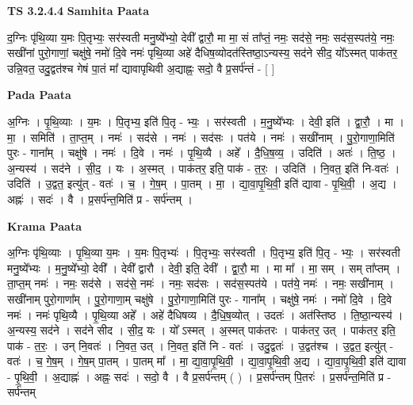 \documentclass[17pt]{extarticle}
\begin{document}
\textbf{TS 3.2.4.4 } \newline
\textbf{Samhita Paata} \newline

द॒ग्निः पृ॑थि॒व्या य॒मः पि॒तृभ्यः॒ सर॑स्वती मनु॒ष्ये᳚भ्यो॒ देवी᳚ द्वारौ॒ मा मा॒ सं ता᳚प्तं॒ नमः॒ सद॑से॒ नमः॒ सद॑स॒स्पत॑ये॒ नमः॒ सखी॑नां पुरो॒गाणां॒ चक्षु॑षे॒ नमो॑ दि॒वे नमः॑ पृथि॒व्या अहे॑ दैधिष॒व्योदत॑स्तिष्ठा॒ऽन्यस्य॒ सद॑ने सीद॒ यो᳚ऽस्मत् पाक॑तर॒ उन्नि॒वत॒ उदु॒द्वत॑श्च गेषं पा॒तं मा᳚ द्यावापृथिवी अ॒द्याह्नः॒ सदो॒ वै प्र॒सर्प॑न्तं - [  ] \newline

\textbf{Pada Paata} \newline

अ॒ग्निः । पृ॒थि॒व्याः । य॒मः । पि॒तृभ्य॒ इति॑ पि॒तृ - भ्यः॒ । सर॑स्वती । म॒नु॒ष्ये᳚भ्यः । देवी॒ इति॑ । द्वा॒रौ॒ । मा । मा॒ । समिति॑ । ता॒प्त॒म् । नमः॑ । सद॑से । नमः॑ । सद॑सः । पत॑ये । नमः॑ । सखी॑नाम् । पु॒रो॒गाणा॒मिति॑ पुरः - गाना᳚म् । चक्षु॑षे । नमः॑ । दि॒वे । नमः॑ । पृ॒थि॒व्यै । अहे᳚ । दै॒धि॒ष॒व्य॒ । उदिति॑ । अतः॑ । ति॒ष्ठ॒ । अ॒न्यस्य॑ । सद॑ने । सी॒द॒ । यः । अ॒स्मत् । पाक॑तर॒ इति॒ पाक॑ - त॒रः॒ । उदिति॑ । नि॒वत॒ इति॑ नि-वतः॑ । उदिति॑ । उ॒द्वत॒ इत्यु॑त् - वतः॑ । च॒ । गे॒ष॒म् । पा॒तम् । मा॒ । द्या॒वा॒पृ॒थि॒वी॒ इति॑ द्यावा - पृ॒थि॒वी॒ । अ॒द्य । अह्नः॑ । सदः॑ । वै । प्र॒सर्प॑न्त॒मिति॑ प्र - सर्प॑न्तम् ।  \newline


\textbf{Krama Paata} \newline

अ॒ग्निः पृ॑थि॒व्याः । पृ॒थि॒व्या य॒मः । य॒मः पि॒तृभ्यः॑ । पि॒तृभ्यः॒ सर॑स्वती । पि॒तृभ्य॒ इति॑ पि॒तृ - भ्यः॒ । सर॑स्वती मनु॒ष्ये᳚भ्यः । म॒नु॒ष्ये᳚भ्यो॒ देवी᳚ । देवी᳚ द्वारौ । देवी॒ इति॒ देवी᳚ । द्वा॒रौ॒ मा । मा मा᳚ । मा॒ सम् । सम् ता᳚प्तम् । ता॒प्त॒म् नमः॑ । नमः॒ सद॑से । सद॑से॒ नमः॑ । नमः॒ सद॑सः । सद॑स॒स्पत॑ये । पत॑ये॒ नमः॑ । नमः॒ सखी॑नाम् । सखी॑नाम् पुरो॒गाणा᳚म् । पु॒रो॒गाणा॒म् चक्षु॑षे । पु॒रो॒गाणा॒मिति॑ पुरः - गाना᳚म् । चक्षु॑षे॒ नमः॑ । नमो॑ दि॒वे । दि॒वे नमः॑ । नमः॑ पृथि॒व्यै । पृ॒थि॒व्या अहे᳚ । अहे॑ दैधिषव्य । दै॒धि॒॒ष॒व्योत् । उदतः॑ । अत॑स्तिष्ठ । ति॒ष्ठा॒न्यस्य॑ । अ॒न्यस्य॒ सद॑ने । सद॑ने सीद । सी॒द॒ यः । यो᳚ ऽस्मत् । अ॒स्मत् पाक॑तरः । पाक॑तर॒ उत् । पाक॑तर॒ इति॒ पाक॑ - त॒रः॒ । उन् नि॒वतः॑ । नि॒वत॒ उत् । नि॒वत॒ इति॑ नि - वतः॑ । उदु॒द्वतः॑ । उ॒द्वत॑श्च । उ॒द्वत॒ इत्यु॑त् - वतः॑ । च॒ गे॒ष॒म् । गे॒ष॒म् पा॒तम् । पा॒तम् मा᳚ । मा॒ द्या॒वा॒पृ॒थि॒वी॒ । द्या॒वा॒पृ॒थि॒वी॒ अ॒द्य । द्या॒वा॒पृ॒थि॒वी॒ इति॑ द्यावा - पृ॒थि॒वी॒ । अ॒द्याह्नः॑ । अह्नः॒ सदः॑ । सदो॒ वै । वै प्र॒सर्प॑न्तम् ( ) । प्र॒सर्प॑न्तम् पि॒तरः॑ । प्र॒सर्प॑न्त॒मिति॑ प्र - सर्प॑न्तम् \newline
\end{document}
